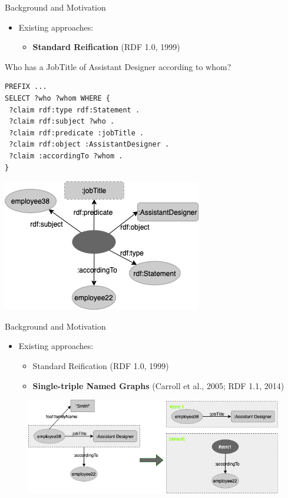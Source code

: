 \documentclass[aspectratio=169]{beamer}
\begin{document}
\begin{frame}[fragile]{Background and Motivation}
    \begin{itemize}
        \item Existing approaches:
            \begin{itemize}
                \item \textbf{Standard Reification} (RDF 1.0, 1999)
            \end{itemize}
    \end{itemize}
    \begin{minipage}{0.56\textwidth}
    \small{Who has a JobTitle of Assistant Designer according to whom?}
\begin{lstlisting}[language=SPARQL]
PREFIX ...
SELECT ?who ?whom WHERE {
 ?claim rdf:type rdf:Statement .
 ?claim rdf:subject ?who .
 ?claim rdf:predicate :jobTitle .
 ?claim rdf:object :AssistantDesigner .
 ?claim :accordingTo ?whom .
}
\end{lstlisting}
\end{minipage}
\begin{minipage}{0.43\textwidth}
\centering
	\includegraphics[scale=0.5]{lecture/images/Example-2-Reification.png}
\end{minipage}
\end{frame}

\begin{frame}{Background and Motivation}
    \begin{itemize}
        \item Existing approaches:
            \begin{itemize}
                \item Standard Reification (RDF 1.0, 1999)
                \item \textbf{Single-triple Named Graphs} (Carroll et al., 2005; RDF 1.1, 2014)
            \end{itemize}
    \end{itemize}
    \begin{figure}
        \centering
        \includegraphics[scale=0.6]{lecture/images/Example-2-To-NamedGraph.png}
    \end{figure}
\end{frame}
\end{document}
